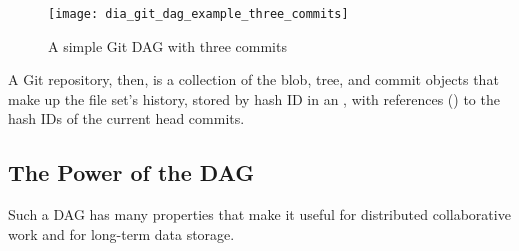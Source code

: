 \begin{figure}[h]
    \centering
    \texttt{[image: dia\_git\_dag\_example\_three\_commits]}
    \caption{A simple Git DAG with three commits}
    \label{dia_git_dag_example_three_commits}
\end{figure}

A Git repository, then, is a collection of the blob, tree, and commit objects
that make up the file set's history, stored by hash ID in an , with references () to the hash IDs of the current head
commits\cite{git_initial_readme}.

%

\subsection{The Power of the DAG}

Such a DAG has many properties that make it useful for distributed collaborative
work and for long-term data storage.

